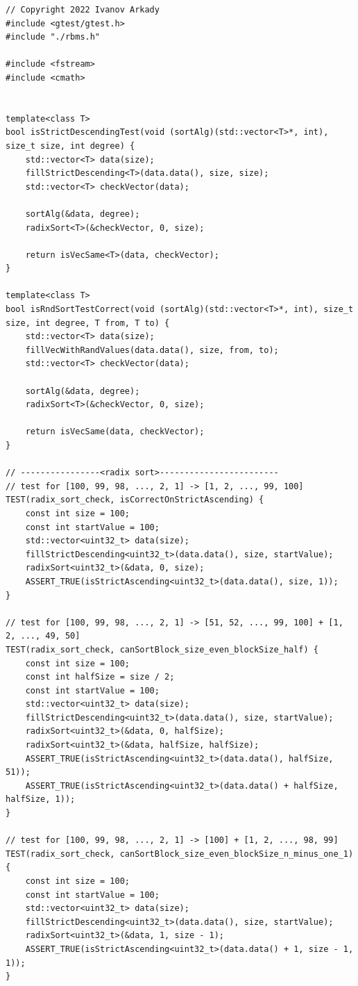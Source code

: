 \documentclass{report}
\begin{document}
\begin{lstlisting}
// Copyright 2022 Ivanov Arkady
#include <gtest/gtest.h>
#include "./rbms.h"

#include <fstream>
#include <cmath>


template<class T>
bool isStrictDescendingTest(void (sortAlg)(std::vector<T>*, int), size_t size, int degree) {
    std::vector<T> data(size);
    fillStrictDescending<T>(data.data(), size, size);
    std::vector<T> checkVector(data);

    sortAlg(&data, degree);
    radixSort<T>(&checkVector, 0, size);

    return isVecSame<T>(data, checkVector);
}

template<class T>
bool isRndSortTestCorrect(void (sortAlg)(std::vector<T>*, int), size_t size, int degree, T from, T to) {
    std::vector<T> data(size);
    fillVecWithRandValues(data.data(), size, from, to);
    std::vector<T> checkVector(data);

    sortAlg(&data, degree);
    radixSort<T>(&checkVector, 0, size);

    return isVecSame(data, checkVector);
}

// ----------------<radix sort>------------------------
// test for [100, 99, 98, ..., 2, 1] -> [1, 2, ..., 99, 100]
TEST(radix_sort_check, isCorrectOnStrictAscending) {
    const int size = 100;
    const int startValue = 100;
    std::vector<uint32_t> data(size);
    fillStrictDescending<uint32_t>(data.data(), size, startValue);
    radixSort<uint32_t>(&data, 0, size);
    ASSERT_TRUE(isStrictAscending<uint32_t>(data.data(), size, 1));
}

// test for [100, 99, 98, ..., 2, 1] -> [51, 52, ..., 99, 100] + [1, 2, ..., 49, 50]
TEST(radix_sort_check, canSortBlock_size_even_blockSize_half) {
    const int size = 100;
    const int halfSize = size / 2;
    const int startValue = 100;
    std::vector<uint32_t> data(size);
    fillStrictDescending<uint32_t>(data.data(), size, startValue);
    radixSort<uint32_t>(&data, 0, halfSize);
    radixSort<uint32_t>(&data, halfSize, halfSize);
    ASSERT_TRUE(isStrictAscending<uint32_t>(data.data(), halfSize, 51));
    ASSERT_TRUE(isStrictAscending<uint32_t>(data.data() + halfSize, halfSize, 1));
}

// test for [100, 99, 98, ..., 2, 1] -> [100] + [1, 2, ..., 98, 99]
TEST(radix_sort_check, canSortBlock_size_even_blockSize_n_minus_one_1) {
    const int size = 100;
    const int startValue = 100;
    std::vector<uint32_t> data(size);
    fillStrictDescending<uint32_t>(data.data(), size, startValue);
    radixSort<uint32_t>(&data, 1, size - 1);
    ASSERT_TRUE(isStrictAscending<uint32_t>(data.data() + 1, size - 1, 1));
}


\end{lstlisting}
\end{document}

